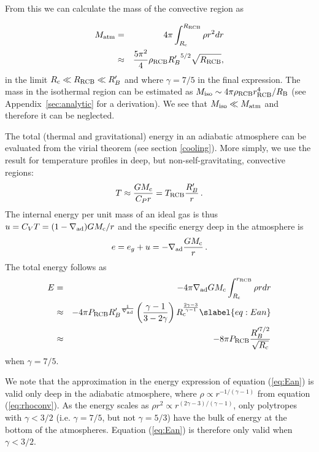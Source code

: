 \documentclass[apj]{emulateapj}
\newcommand{\delad}{\nabla_{\rm ad}}
\newcommand{\App}[1]{Appendix~\ref{#1}}
\newcommand{\Rg}{\mathcal{R}}
\newcommand{\co}{_{\rm c}}
\newcommand{\di}{_{\rm d}}
\newcommand{\cb}{_{\rm RCB}}
\begin{document}
From this we can calculate the mass of the convective region as

\begin{eqnarray} 
\label{eq:Matman}
M_{\rm atm} &=& 4 \pi \int_{R\co}^{R\cb} \rho r^2 dr \\
&\approx& {5 \pi^2 \over 4} \rho\cb {R_B'}^{5/2} \sqrt{R\cb}, %
\end{eqnarray}
in the limit $R\co \ll R\cb \ll R_B'$ and where $\gamma=7/5$ in the final expression. The mass in the isothermal region can be estimated as $M_{\rm iso} \sim 4 \pi \rho\cb r\cb^4/R_{\rm B}$ (see \App{sec:analytic} for a derivation).  We see that $M_{\rm{iso}} \ll M_{\rm{atm}}$ and therefore it can be neglected.


The total (thermal and gravitational) energy in an adiabatic atmosphere can be evaluated from the virial theorem (see section \ref{cooling}).  More simply, we use the result for temperature profiles in deep, but non-self-gravitating, convective regions:
\begin{equation}
T \approx {G M\co \over C_P r} = T\cb {R_B' \over r}\, .
\end{equation} 
The internal energy per unit mass of an ideal gas is thus $u = C_V T = (1 - \delad) G M\co/r$ and the specific energy  deep in the atmosphere is
\begin{equation}
e = e_g + u = -\delad {GM\co \over r} \, .
\end{equation} 
The total energy follows as
\begin{eqnarray} 
E &=& - 4 \pi \nabla_{\rm ad} G M\co \int_{R\co}^{r\cb} \rho r dr \\
&\approx& - 4 \pi P\cb {R_B'}^{1 \over \nabla_{\rm ad}} \left(\gamma-1 \over 3 - 2 \gamma\right)  R\co^{2\gamma-3\over \gamma-1}  \slabel{eq:Ean} \\ 
&\approx& - 8 \pi P\cb {R_B'^{7/2} \over \sqrt{R\co}}
\end{eqnarray} 
when $\gamma = 7/5$. %

We note that the approximation in the energy expression of equation (\ref{eq:Ean}) is valid only deep in the adiabatic atmosphere, where  $\rho \propto r^{-1/(\gamma -1)}$ from equation (\ref{eq:rhoconv}).  As the energy scales as $\rho r^2 \propto r^{(2\gamma -3)/(\gamma - 1)}$, only polytropes with $\gamma < 3/2$ (i.e. $\gamma = 7/5$, but not $\gamma = 5/3$) have the bulk of energy at the bottom of the atmospheres.  Equation (\ref{eq:Ean}) is therefore only valid when $\gamma<3/2$. %
\end{document}

